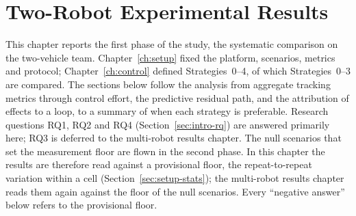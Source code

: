 %
%
%

\chapter{Two-Robot Experimental Results}
\label{ch:results2}

This chapter reports the first phase of the study, the systematic comparison on the two-vehicle
team. Chapter~\ref{ch:setup}
fixed the platform, scenarios, metrics and protocol; Chapter~\ref{ch:control}
defined Strategies~0--4, of which Strategies~0--3 are compared. The sections below follow the analysis
from aggregate tracking metrics through control effort, the predictive residual path, and the
attribution of effects to a loop, to a summary of when each strategy is preferable. Research
questions RQ1, RQ2 and RQ4 (Section~\ref{sec:intro-rq}) are answered primarily here; RQ3 is
deferred to the multi-robot results chapter.
The null scenarios that set the measurement floor are flown in the second phase. In this chapter the
results are therefore read against a provisional floor, the repeat-to-repeat variation within a
cell (Section~\ref{sec:setup-stats}); the multi-robot results chapter reads them again against the
floor of the null scenarios. Every ``negative answer'' below refers to the provisional floor.

